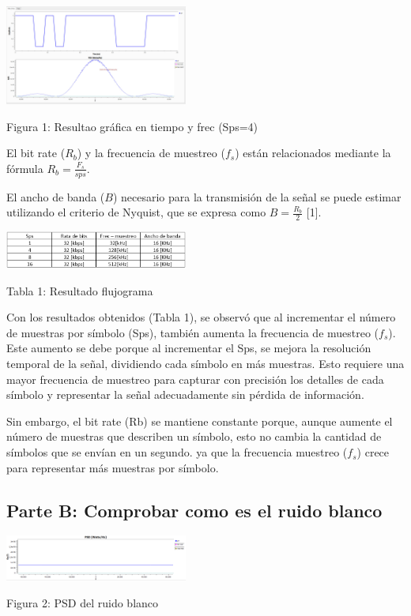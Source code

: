 \documentclass{journal}[IEEEtran, twocolumn]             %
\begin{document}
\begin{multicols}{2}
    \begin{center}
    \includegraphics[width=0.45\textwidth]{figs/F1.png}
    \caption{Figura 1: Resultao gráfica en tiempo y frec (Sps=4)}
    \end{center}
    
El bit rate ($R_b$) y la frecuencia de muestreo ($f_s$) están relacionados mediante la fórmula $R_b = \frac{F_s}{sps}$.

El ancho de banda ($B$) necesario para la transmisión de la señal se puede estimar utilizando el criterio de Nyquist, que se expresa como $B = \frac{R_b}{2}$ [1].

    \begin{center}
    \includegraphics[width=0.45\textwidth]{figs/F2.png}
    \caption{Tabla 1: Resultado flujograma}
    \end{center}
    
Con los resultados obtenidos (Tabla 1), se observó que al incrementar el número de muestras por símbolo (Sps), también aumenta la frecuencia de muestreo ($f_s$). Este aumento se debe porque al incrementar el Sps, se mejora la resolución temporal de la señal, dividiendo cada símbolo en más muestras. Esto requiere una mayor frecuencia de muestreo para capturar con precisión los detalles de cada símbolo y representar la señal adecuadamente sin pérdida de información. 

Sin embargo, el bit rate (Rb) se mantiene constante porque, aunque aumente el número de muestras que describen un símbolo, esto no cambia la cantidad de símbolos que se envían en un segundo. ya que la frecuencia muestreo ($f_s$) crece para representar más muestras por símbolo.


\subsection{Parte B: Comprobar como es el ruido blanco}

    \begin{center}
    \includegraphics[width=0.45\textwidth]{figs/F3.png}
    \caption{Figura 2: PSD del ruido blanco}
    \end{center}


\end{multicols}
\end{document}
